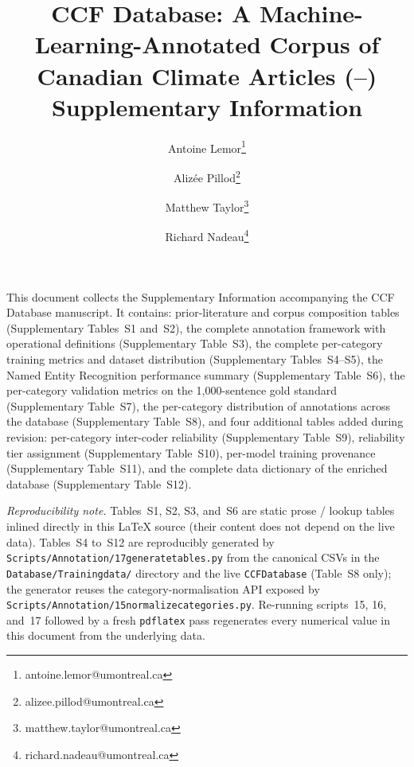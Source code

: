 \documentclass[12pt]{article}
\title{\textbf{CCF Database: A Machine-Learning-Annotated Corpus of \CCFarticles{} Canadian Climate Articles (\CCFyearfirst{}--\CCFyearlast{})}\\[0.4em]
\large Supplementary Information}
\author[1]{Antoine Lemor\thanks{antoine.lemor@umontreal.ca}}
\author[2]{Aliz\'ee Pillod\thanks{alizee.pillod@umontreal.ca}}
\author[2]{Matthew Taylor\thanks{matthew.taylor@umontreal.ca}}
\author[2]{Richard Nadeau\thanks{richard.nadeau@umontreal.ca}}
\affil[1]{Universit\'e de Sherbrooke}
\affil[2]{Universit\'e de Montr\'eal}
\date{}
\renewcommand\_{\texttt{\detokenize{_}\allowbreak}}
\begin{document}
\maketitle
\thispagestyle{empty}

\noindent This document collects the Supplementary Information accompanying the CCF Database manuscript. It contains: prior-literature and corpus composition tables (Supplementary Tables~S1 and~S2), the complete annotation framework with operational definitions (Supplementary Table~S3), the complete per-category training metrics and dataset distribution (Supplementary Tables~S4--S5), the Named Entity Recognition performance summary (Supplementary Table~S6), the per-category validation metrics on the 1{,}000-sentence gold standard (Supplementary Table~S7), the per-category distribution of annotations across the database (Supplementary Table~S8), and four additional tables added during revision: per-category inter-coder reliability (Supplementary Table~S9), reliability tier assignment (Supplementary Table~S10), per-model training provenance (Supplementary Table~S11), and the complete data dictionary of the enriched database (Supplementary Table~S12).

\vspace{0.5em}
{\sloppy
\noindent\textit{Reproducibility note.} Tables~S1, S2, S3, and~S6 are static prose / lookup tables inlined directly in this LaTeX source (their content does not depend on the live data). Tables~S4 to~S12 are reproducibly generated by \texttt{Scripts/Annotation/17\_generate\_tables.py} from the canonical CSVs in the \texttt{Database/Training\_data/} directory and the live \texttt{CCF\_Database} (Table~S8 only); the generator reuses the category-normalisation API exposed by \texttt{Scripts/Annotation/15\_normalize\_categories.py}. Re-running scripts~15, 16, and~17 followed by a fresh \texttt{pdflatex} pass regenerates every numerical value in this document from the underlying data.
\par}
\end{document}
